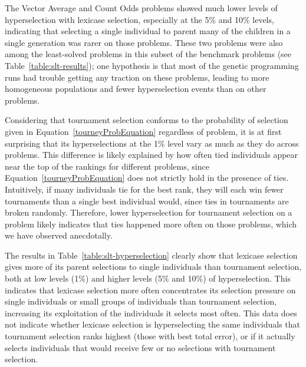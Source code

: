 \documentclass{sig-alternate}
\begin{document}
The Vector Average and Count Odds problems showed much lower levels of hyperselection with lexicase selection, especially at the 5\% and 10\% levels, indicating that selecting a single individual to parent many of the children in a single generation was rarer on those problems. These two problems were also among the least-solved problems in this subset of the benchmark problems (see Table~\ref{table:slt-results}); one hypothesis is that most of the genetic programming runs had trouble getting any traction on these problems, leading to more homogeneous populations and fewer hyperselection events than on other problems.

%

Considering that tournament selection conforms to the probability of selection given in Equation~\ref{tourneyProbEquation} regardless of problem, it is at first surprising that its hyperselections at the 1\% level vary as much as they do across problems. This difference is likely explained by how often tied individuals appear near the top of the rankings for different problems, since Equation~\ref{tourneyProbEquation} does not strictly hold in the presence of ties. Intuitively, if many individuals tie for the best rank, they will each win fewer tournaments than a single best individual would, since ties in tournaments are broken randomly. Therefore, lower hyperselection for tournament selection on a problem likely indicates that ties happened more often on those problems, which we have observed anecdotally.


The results in Table~\ref{table:slt-hyperselection} clearly show that lexicase selection gives more of its parent selections to single individuals than tournament selection, both at low levels (1\%) and higher levels (5\% and 10\%) of hyperselection. This indicates that lexicase selection more often concentrates its selection pressure on single individuals or small groups of individuals than tournament selection, increasing its exploitation of the individuals it selects most often. This data does not indicate whether lexicase selection is hyperselecting the same individuals that tournament selection ranks highest (those with best total error), or if it actually selects individuals that would receive few or no selections with tournament selection.
\end{document}
